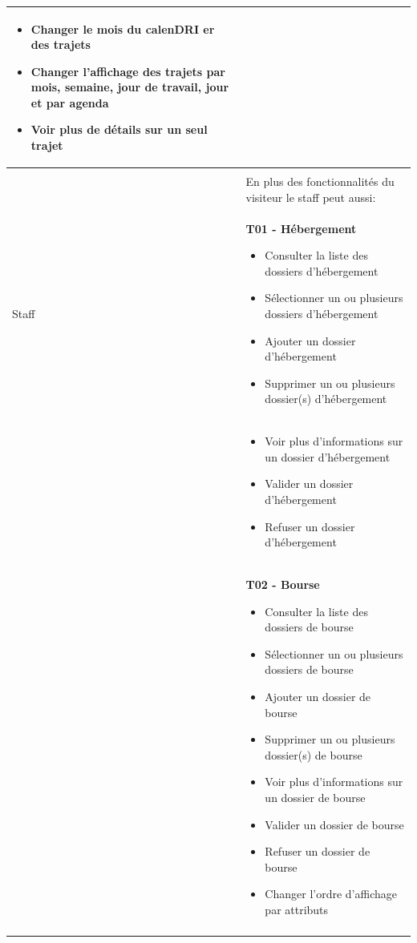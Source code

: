 \begin{longtable}{|Z{3cm}|L{10cm}|}
        \begin{itemize}
            \item Changer le mois du calen\acs{DRI} er des trajets
            \item Changer l’affichage des trajets par mois, semaine, jour de travail, jour et par agenda
            \item Voir plus de détails sur un seul trajet
        \end{itemize}
     \\
     \hline
    & \\ &
    En plus des fonctionnalités du visiteur le staff peut aussi:\\
    Staff &
    \textbf{T01 - Hébergement}
    \begin{itemize}
        \item Consulter la liste des dossiers d'hébergement
        \item Sélectionner un ou plusieurs dossiers d'hébergement
        \item Ajouter un dossier d'hébergement
        \item Supprimer un ou plusieurs dossier(s) d'hébergement
    \end{itemize}\\
    &
    \begin{itemize}
        \item Voir plus d'informations sur un dossier d'hébergement
        \item Valider un dossier d'hébergement
        \item Refuser un dossier d'hébergement
    \end{itemize}\\
    &
    \textbf{T02 - Bourse}
    \begin{itemize}
        \item Consulter la liste des dossiers de bourse
        \item Sélectionner un ou plusieurs dossiers de bourse
        \item Ajouter un dossier de bourse
        \item Supprimer un ou plusieurs dossier(s) de bourse
        \item Voir plus d'informations sur un dossier de bourse
        \item Valider un dossier de bourse
        \item Refuser un dossier de bourse
        \item Changer l'ordre d'affichage par attributs
    \end{itemize}\\ &

\end{longtable}
